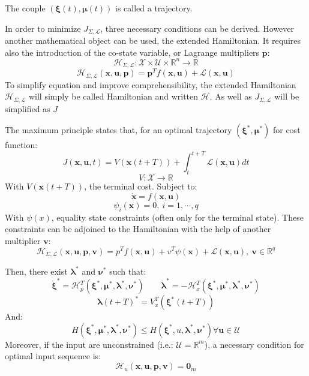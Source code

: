 \documentclass[a4paper, 12pt]{report}
\begin{document}
The couple $(\boldsymbol{\xi}(t), \boldsymbol{\mu}(t))$ is called a trajectory.

In order to minimize  $J_{\Sigma,\mathcal{L}}$, three necessary conditions can be derived. However another mathematical object can be used, the extended Hamiltonian. It requires also the introduction of the co-state variable, or Lagrange multipliers $\boldsymbol{p}$:
\[ \mathcal{H}_{\Sigma,\mathcal{L}}: \mathcal{X} \times \mathcal{U} \times \mathbb{R}^n \rightarrow \mathbb{R} \]
\[ \mathcal{H}_{\Sigma,\mathcal{L}}(\boldsymbol{x}, \boldsymbol{u}, \boldsymbol{p}) = \boldsymbol{p}^Tf(\boldsymbol{x}, \boldsymbol{u}) + \mathcal{L}(\boldsymbol{x}, \boldsymbol{u}) \]
To simplify equation and improve comprehensibility, the extended Hamiltonian $\mathcal{H}_{\Sigma,\mathcal{L}}$ will simply be called Hamiltonian and written $\mathcal{H}$. As well as $J_{\Sigma,\mathcal{L}}$ will be simplified as $J$

The maximum principle states that, for an optimal trajectory $(\boldsymbol{\xi}^*, \boldsymbol{\mu}^*)$ for cost function:
\[ J(\boldsymbol{x}, \boldsymbol{u}, t) = V(\boldsymbol{x}(t+T))  + \int_t^{t+T} \mathcal{L}(\boldsymbol{x}, \boldsymbol{u})dt\]
\[ V: \mathcal{X} \rightarrow \mathbb{R} \]
With $ V(\boldsymbol{x}(t+T))$, the terminal cost. Subject to:
\[ \boldsymbol{\dot x} = f(\boldsymbol{x}, \boldsymbol{u}) \]
\[ \psi_i(\boldsymbol{x}) = 0,\ i = 1, \cdots, q \]
With $\psi(x)$, equality state constraints (often only for the terminal state). These constraints can be adjoined to the Hamiltonian with the help of another multiplier $\boldsymbol{v}$:
\[ \mathcal{H}_{\Sigma,\mathcal{L}}(\boldsymbol{x}, \boldsymbol{u}, \boldsymbol{p}, \boldsymbol{v}) = p^T f(\boldsymbol{x}, \boldsymbol{u}) + v^T\psi(\boldsymbol{x}) + \mathcal{L}(\boldsymbol{x}, \boldsymbol{u}),\ \boldsymbol{v} \in \mathbb{R}^q \]

Then, there exist $\boldsymbol{\lambda}^*$ and $\boldsymbol{\nu}^*$ such that:
\[ \boldsymbol{\dot \xi}^* = \mathcal{H}_p^T (\boldsymbol{\xi}^*, \boldsymbol{\mu}^*, \boldsymbol{\lambda}^*, \boldsymbol{\nu}^*)  \qquad \boldsymbol{\dot \lambda}^*  = -\mathcal{H}_x^T (\boldsymbol{\xi}^*, \boldsymbol{\mu}^*, \boldsymbol{\lambda}^*, \boldsymbol{\nu}^*)\]
\[ \boldsymbol{\lambda}(t+T)^* = V_x^T(\boldsymbol{\xi}^*(t+T)) \]
And:
\[ H(\boldsymbol{\xi}^*, \boldsymbol{\mu}^*, \boldsymbol{\lambda}^*, \boldsymbol{\nu}^*) \leq H(\boldsymbol{\xi}^*, u, \boldsymbol{\lambda}^*, \boldsymbol{\nu}^*) \forall \boldsymbol{u} \in \mathcal{U} \]
Moreover, if the input are unconstrained (i.e.: $\mathcal{U}=\mathbb{R}^m$), a necessary condition for optimal input sequence is:
\[ \mathcal{H}_u (\boldsymbol{x}, \boldsymbol{u}, \boldsymbol{p}, \boldsymbol{v}) = \boldsymbol{0}_m \]
\end{document}
